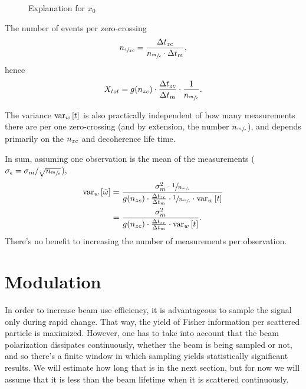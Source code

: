 \documentclass{article}
\begin{document}
\begin{figure}[h]
	\centering
	\caption{Explanation for $x_0$\label{fig:x0Expl}}
\end{figure}

The number of events per zero-crossing 
\[
	n_{\sfrac{\epsilon}{zc}} = \frac{\Delta t_{zc}}{n_{\sfrac{m}{\epsilon}}\cdot \Delta t_{m}},
\]
hence
\[
	X_{tot} = g(n_{zc}) \cdot \frac{\Delta t_{zc}}{\Delta t_{m}}\cdot \frac{1}{n_{\sfrac{m}{\epsilon}}}.
\]

The variance $\var[w]{t}$ is also practically independent of how many measurements there are per one zero-crossing (and by extension, the number $n_{\sfrac{m}{\epsilon}}$), and depends primarily on the $n_{zc}$ and decoherence life time.

In sum, assuming one observation is the mean of the measurements ($\SD{\obs} = \SD{\meas}/\sqrt{\Nmo}$), 
\begin{align*}
	\var[w]{\hat{\omega}} &= \frac{\SD{\meas}^2\cdot \sfrac{1}{\Nmo}}{g(\Nzc)\cdot \frac{\Delta t_{zc}}{\Delta t_{\meas}}\cdot \sfrac{1}{\Nmo} \cdot \var[w]{t}} \\
		&= \frac{\SD{\meas}^2}{g(\Nzc)\cdot \frac{\Delta t_{zc}}{\Delta t_{\meas}} \cdot \var[w]{t}}.
\end{align*}
There's no benefit to increasing the number of measurements per observation.

\section{Modulation}

In order to increase beam use efficiency, it is advantageous to sample the signal only during rapid change. That way, the yield of Fisher information per scattered particle is maximized. However, one has to take into account that the beam polarization dissipates continuously, whether the beam is being sampled or not, and so there's a finite window in which sampling yields statistically significant results. We will estimate how long that is in the next section, but for now we will assume that it is less than the beam lifetime when it is scattered continuously.
\end{document}
